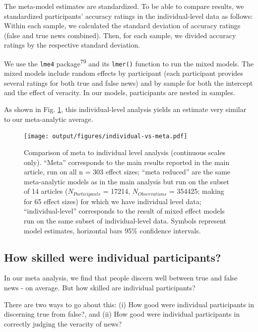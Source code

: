 \documentclass[
  man]{apa6}
\begin{document}
The meta-model estimates are standardized. To be able to compare results, we standardized participants' accuracy ratings in the individual-level data as follows: Within each sample, we calculated the standard deviation of accuracy ratings (false and true news combined). Then, for each sample, we divided accuracy ratings by the respective standard deviation.

We use the \texttt{lme4} package\textsuperscript{79} and its \texttt{lmer()} function to run the mixed models. The mixed models include random effects by participant (each participant provides several ratings for both true and false news) and by sample for both the intercept and the effect of veracity. In our models, participants are nested in samples.

As shown in Fig. \ref{fig:individual-vs-meta}, this individual-level analysis yields an estimate very similar to our meta-analytic average.



\begin{figure}
\centering
\texttt{[image: output/figures/individual-vs-meta.pdf]}
\caption{\label{fig:individual-vs-meta}Comparison of meta to individual level analysis (continuous scales only). ``Meta'' corresponds to the main results reported in the main article, run on all n = 303 effect sizes; ``meta reduced'' are the same meta-analytic models as in the main analysis but run on the subset of 14 articles (\(N_{Participants}\) = 17214, \(N_{Observations}\) = 354425; making for 65 effect sizes) for which we have individual level data; ``individual-level'' corresponds to the result of mixed effect models run on the same subset of individual-level data. Symbols represent model estimates, horizontal bars 95\% confidence intervals.}
\end{figure}

\subsection{How skilled were individual participants?}\label{how-skilled-were-individual-participants}

In our meta analysis, we find that people discern well between true and false news - on average. But how skilled are individual participants?

There are two ways to go about this: (i) How good were individual participants in discerning true from false?, and (ii) How good were individual participants in correctly judging the veracity of news?
\end{document}
